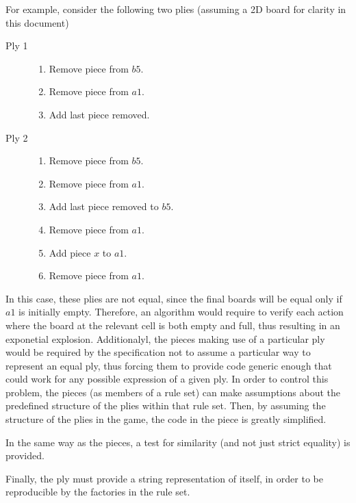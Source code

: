	 								For example, consider the following two plies (assuming a 2D board for clarity in this document)
	 									\begin{description}
	 										\item[Ply 1]
	 											\begin{enumerate}
	 												\item Remove piece from $b5$. 
	 												\item Remove piece from $a1$.
	 												\item Add last piece removed. 
	 											\end{enumerate}
	 										\item[Ply 2]
	 											\begin{enumerate}
	 												\item Remove piece from $b5$.
	 												\item Remove piece from $a1$.
	 												\item Add last piece removed to $b5$. 
	 												\item Remove piece from $a1$. 
	 												\item Add piece $x$ to $a1$.
	 												\item Remove piece from $a1$. 
	 											\end{enumerate}
	 									\end{description}				
		In this case, these plies are not equal, since the final boards will be equal only if $a1$ is initially empty.
		Therefore, an algorithm would require to verify each action where the board at the relevant cell is both empty 
		and full, thus resulting in an exponetial explosion. Additionalyl, the pieces making use of a particular ply 
		would be required by the specification not to assume a particular way to represent an equal ply, thus forcing them 
		to provide code generic enough that could work for any possible expression of a given ply. In order to control this 
		problem, the pieces (as members of a rule set) can make assumptions about the predefined structure of the plies
		within that rule set. Then, by assuming the structure of the plies in the game, the code in the piece is greatly
		simplified. 
		
		In the same way as the pieces, a test for similarity (and not just strict equality) is provided. 
		
		Finally, the ply must provide a string representation of itself, in order to be reproducible by the factories 
		in the rule set. 
	
